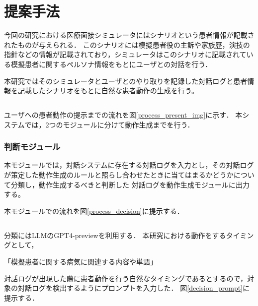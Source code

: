 \chapter{提案手法} \label{concept}
今回の研究における医療面接シミュレータにはシナリオという患者情報が記載されたものが与えられる．
このシナリオには模擬患者役の主訴や家族歴，演技の指針などの情報が記載されており，シミュレータはこのシナリオに記載されている模擬患者に関するペルソナ情報をもとにユーザとの対話を行う．
\par
本研究ではそのシミュレータとユーザとのやり取りを記録した対話ログと患者情報を記載したシナリオをもとに自然な患者動作の生成を行う。

\section{}
\begin{figure}[p]
\end{figure}

\par 
ユーザへの患者動作の提示までの流れを図\ref{process_present_img}に示す．
本システムでは，2つのモジュールに分けて動作生成までを行う．

\subsection{判断モジュール}\label{decision_module}
本モジュールでは，対話システムに存在する対話ログを入力とし，その対話ログが策定した動作生成のルールと照らし合わせたときに当てはまるかどうかについて分類し，動作生成するべきと判断した 対話ログを動作生成モジュールに出力する。
\par
本モジュールでの流れを図\ref{process_decision}に提示する．

\section{}
\begin{figure}[p]
\end{figure}

分類にはLLMのGPT4-previewを利用する． 
本研究における動作をするタイミングとして，
\centerline{「模擬患者に関する病気に関連する内容や単語」}
対話ログが出現した際に患者動作を行う自然なタイミングであるとするので，対象の対話ログを検出するようにプロンプトを入力した．
図\ref{decision_prompt}に提示する．

\section{}
\begin{figure}[p]
\end{figure}

